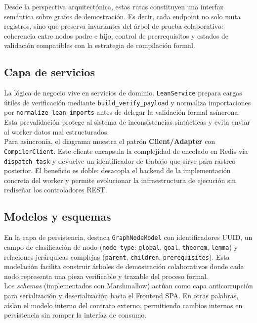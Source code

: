 \documentclass[12pt, letterpaper]{article}
\begin{document}
Desde la perspectiva arquitectónica, estas rutas constituyen una interfaz semántica sobre grafos de demostración. Es decir, cada endpoint no solo muta registros, sino que preserva invariantes del árbol de prueba colaborativo: coherencia entre nodos padre e hijo, control de prerrequisitos y estados de validación compatibles con la estrategia de compilación formal.

\subsection{Capa de servicios}

La lógica de negocio vive en servicios de dominio. \texttt{LeanService} prepara cargas útiles de verificación mediante \texttt{build\_verify\_payload} y normaliza importaciones por \texttt{normalize\_lean\_imports} antes de delegar la validación formal asíncrona. Esta prevalidación protege al sistema de inconsistencias sintácticas y evita enviar al worker datos mal estructurados.\\

Para asincronía, el diagrama muestra el patrón \textbf{Client/Adapter} con \texttt{CompilerClient}. Este cliente encapsula la complejidad de encolado en Redis vía \texttt{dispatch\_task} y devuelve un identificador de trabajo que sirve para rastreo posterior. El beneficio es doble: desacopla el backend de la implementación concreta del worker y permite evolucionar la infraestructura de ejecución sin rediseñar los controladores REST.

\subsection{Modelos y esquemas}

En la capa de persistencia, destaca \texttt{GraphNodeModel} con identificadores UUID, un campo de clasificación de nodo (\texttt{node\_type}: \texttt{global}, \texttt{goal}, \texttt{theorem}, \texttt{lemma}) y relaciones jerárquicas complejas (\texttt{parent}, \texttt{children}, \texttt{prerequisites}). Esta modelación facilita construir árboles de demostración colaborativos donde cada nodo representa una pieza verificable y trazable del proceso formal.\\

Los \textit{schemas} (implementados con Marshmallow) actúan como capa anticorrupción para serialización y deserialización hacia el Frontend SPA. En otras palabras, aíslan el modelo interno del contrato externo, permitiendo cambios internos en persistencia sin romper la interfaz de consumo.\\
\end{document}
